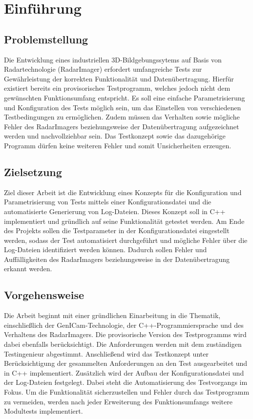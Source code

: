 \chapter{Einführung}

\section{Problemstellung}

Die Entwicklung eines industriellen 3D-Bildgebungssytems auf Basis von Radartechnologie (RadarImager) erfordert umfangreiche Tests zur Gewährleistung 
der korrekten Funktionalität und Datenübertragung. Hierfür existiert bereits ein provisorisches Testprogramm, welches jedoch nicht dem gewünschten Funktionsumfang entspricht.
Es soll eine einfache Parametrisierung und Konfiguration des Tests möglich sein, um das Einstellen von verschiedenen Testbedingungen zu ermöglichen. Zudem müssen das Verhalten 
sowie mögliche Fehler des RadarImagers beziehungsweise der Datenübertragung aufgezeichnet werden und nachvollziehbar sein. Das Testkonzept sowie das dazugehörige Programm 
dürfen keine weiteren Fehler und somit Unsicherheiten erzeugen.

\section{Zielsetzung}

Ziel dieser Arbeit ist die Entwicklung eines Konzepts für die Konfiguration und Parametrisierung von Tests mittels einer Konfigurationsdatei und
die automatisierte Generierung von Log-Dateien. Dieses Konzept soll in C++ implementiert und gründlich auf seine Funktionalität getestet werden. Am
Ende des Projekts sollen die Testparameter in der Konfigurationsdatei eingestellt werden, sodass der Test automatisiert durchgeführt und mögliche
Fehler über die Log-Dateien identifiziert werden können. Dadurch sollen Fehler und Auffälligkeiten des RadarImagers beziehungsweise in der Datenübertragung erkannt werden.

\section{Vorgehensweise}

Die Arbeit beginnt mit einer gründlichen Einarbeitung in die Thematik, einschließlich der GenICam-Technologie, der C++-Programmiersprache und
des Verhaltens des RadarImagers. Die provisorische Version des Testprogramms wird dabei ebenfalls berücksichtigt. Die Anforderungen
werden mit dem zuständigen Testingenieur abgestimmt. Anschließend wird das Testkonzept unter Berücksichtigung der gesammelten Anforderungen an
den Test ausgearbeitet und in C++ implementiert. Zusätzlich wird der Aufbau der Konfigurationsdatei und der Log-Dateien festgelegt. Dabei steht die Automatisierung des
Testvorgangs im Fokus. Um die Funktionalität sicherzustellen und Fehler durch das Testprogramm zu vermeiden, werden nach jeder Erweiterung des
Funktionsumfangs weitere Modultests implementiert.